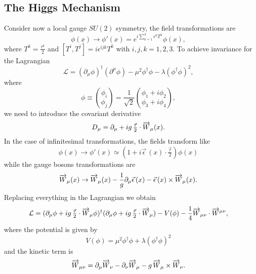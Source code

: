 \subsection{The Higgs Mechanism}
\label{sec:higgs-model}
Consider now a local gauge $SU(2)$ symmetry, the field transformations
are
\begin{equation}
  \label{eq:33}
  \phi(x) \rightarrow \phi'(x) = e^{i \textstyle{\sum_{k = 1}^{3}}
    \epsilon^{k} T^{k}} \phi(x),
\end{equation}
where $T^{k} = \frac{\tau^{k}}{2}$ and $[T^{i},T^{j}] = i
\epsilon^{ijk}T^{k}$ with $i,j,k = 1,2,3$. To achieve invariance for
the Lagrangian
\begin{equation}
  \label{eq:34}
  \mathcal{L} =(\partial_{\mu} \phi)^{\dagger}(\partial^{\mu} \phi) -
  \mu^{2}\phi^{\dagger}\phi - \lambda (\phi^{\dagger}\phi)^{2},
\end{equation}
where
\begin{equation}
  \label{eq:35}
  \phi \equiv \binom{\phi_{i}}{\phi_{j}} = \frac{1}{\sqrt{2}}
  \binom{\phi_{1} + i \phi_{2}}{\phi_{3} + i \phi_{4}},
\end{equation}
we need to introduce the covariant derivative
\begin{equation}
  \label{eq:36}
  D_{\mu} = \partial_{\mu} + i g\,\tfrac{\vec \tau}{2} \cdot \overrightarrow{W}_{\mu}(x).
\end{equation}
In the case of infinitesimal transformations, the fields transform
like
\begin{equation}
  \label{eq:37}
  \phi(x) \rightarrow \phi'(x) \simeq ( 1 + i \vec \epsilon\, (x) \cdot
  \tfrac{\vec \tau}{2}) \phi(x)
\end{equation}
while the gauge bosons transformations are
\begin{equation}
  \label{eq:38}
  \overrightarrow{W}_{\mu} (x) \rightarrow \overrightarrow{W}_{\mu}(x) -
  \frac{1}{g} \partial_{\mu} \vec \epsilon \, (x) - \vec \epsilon\,(x)
  \times \overrightarrow{W}_{\mu} (x).
\end{equation}
Replacing everything in the Lagrangian we obtain
\begin{equation}
  \label{eq:39}
  \mathcal{L} = ( \partial_{\mu} \phi + i g\,\tfrac{\vec \tau}{2}
  \cdot \overrightarrow{W}_{\mu} \phi)^{\dagger} (\partial_{\mu} \phi + i
  g\,\tfrac{\vec \tau}{2} \cdot \overrightarrow{W}_{\mu}) - V(\phi) -
  \frac{1}{4} \overrightarrow{W}_{\mu\nu} \cdot \overrightarrow{W}^{\mu\nu},
\end{equation}
where the potential is given by
\begin{equation}
  \label{Esq:40}
  V(\phi) = \mu^{2} \phi^{\dagger} \phi + \lambda(\phi^{\dagger} \phi)^{2}
\end{equation}
and the kinetic term is
\begin{equation}
  \label{eq:41}
  \overrightarrow{W}_{\mu\nu} = \partial_{\mu} \overrightarrow{W}_{\nu} - \partial_{\nu} \overrightarrow{W}_{\mu}
  - g\,\overrightarrow{W}_{\mu} \times \overrightarrow{W}_{\nu}.
\end{equation}

